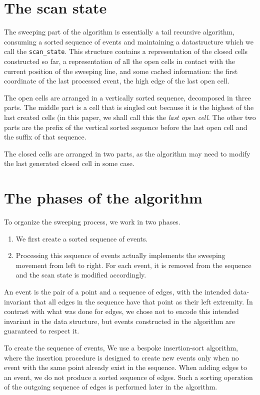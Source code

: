 \documentclass[a4paper, USenglish, cleveref, autoref, thm-restate]{lipics-v2021}
\begin{document}
\section{The scan state}

The sweeping part of the algorithm is essentially a tail recursive
algorithm, consuming a sorted sequence of events and
maintaining a datastructure which we call the {\tt scan\_state}.  This
structure contains a representation of the closed cells constructed so
far, a representation of all the open cells in contact with the
current position of the sweeping line, and some cached information:
the first coordinate of the last processed event, the high edge of the
last open cell.

The open cells are arranged in a vertically sorted sequence,
decomposed in three parts.  The middle part is a cell that is singled
out because it is the highest of the last created cells (in this
paper, we shall call this the {\em last open cell}.  The other two
parts are the prefix of the vertical sorted sequence before the last
open cell and the suffix of that sequence.

The closed cells are arranged in two parts, as the algorithm may need
to modify the last generated closed cell in some case.

\section{The phases of the algorithm}
To organize the sweeping process, we work in two phases.
\begin{enumerate}
\item  We first
create a sorted sequence of events.
\item Processing this sequence of
  events actually implements the sweeping movement from left to right.
  For each event, it is removed from the sequence and the scan state
  is modified accordingly.
\end{enumerate}

An event is the pair of a point and a sequence of edges, with the
intended data-invariant
that all edges in the sequence have that point as their left
extremity.  In contrast with what was done for edges, we chose not
to encode this intended invariant in the data structure, but
events constructed in the algorithm are guaranteed to respect it.

To create the sequence of events,
We use a bespoke insertion-sort algorithm, where the insertion
procedure is designed to create new events only when no event with the
same point already exist in the sequence.  When adding edges to an
event, we do not produce a sorted sequence of edges.  Such a sorting
operation of the outgoing sequence of edges is performed later in the
algorithm.
\end{document}
